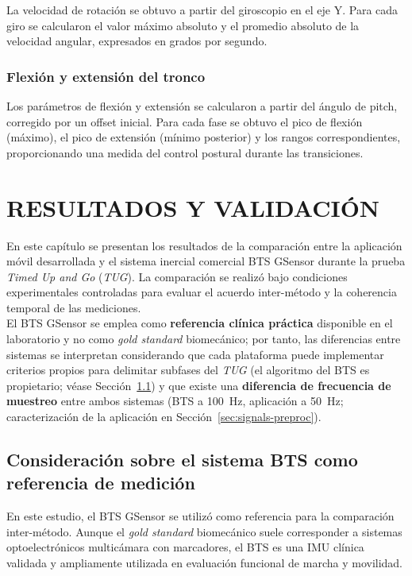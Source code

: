 \documentclass[12pt]{report}
\begin{document}
\begin{justify}
    La velocidad de rotación se obtuvo a partir del giroscopio en el eje Y. Para cada giro se calcularon el valor máximo absoluto y el promedio absoluto de la velocidad angular, expresados en grados por segundo.

    \subsection{Flexión y extensión del tronco}

    Los parámetros de flexión y extensión se calcularon a partir del ángulo de pitch, corregido por un offset inicial. Para cada fase se obtuvo el pico de flexión (máximo), el pico de extensión (mínimo posterior) y los rangos correspondientes, proporcionando una medida del control postural durante las transiciones.




    \chapter{RESULTADOS Y VALIDACIÓN}
    \label{ch:resultados-validacion}

    En este capítulo se presentan los resultados de la comparación entre la aplicación móvil desarrollada y el sistema inercial comercial BTS GSensor durante la prueba \textit{Timed Up and Go} (\textit{TUG}). La comparación se realizó bajo condiciones experimentales controladas para evaluar el acuerdo inter-método y la coherencia temporal de las mediciones.\\

    El BTS GSensor se emplea como \textbf{referencia clínica práctica} disponible en el laboratorio y no como \textit{gold standard} biomecánico; por tanto, las diferencias entre sistemas se interpretan considerando que cada plataforma puede implementar criterios propios para delimitar subfases del \textit{TUG} (el algoritmo del BTS es propietario; véase Sección~\ref{sec:consideracion-bts}) y que existe una \textbf{diferencia de frecuencia de muestreo} entre ambos sistemas (BTS a 100~Hz, aplicación a 50~Hz; caracterización de la aplicación en Sección~\ref{sec:signals-preproc}).


    \section{Consideración sobre el sistema BTS como referencia de medición}
    \label{sec:consideracion-bts}

    En este estudio, el BTS GSensor se utilizó como referencia para la comparación inter-método. Aunque el \textit{gold standard} biomecánico suele corresponder a sistemas optoelectrónicos multicámara con marcadores, el BTS es una IMU clínica validada y ampliamente utilizada en evaluación funcional de marcha y movilidad.\\


\end{justify}
\end{document}
